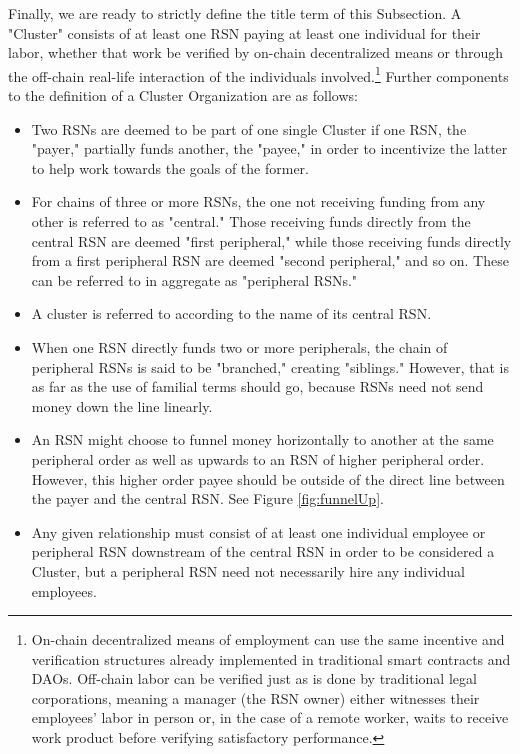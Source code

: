 \documentclass{article}[10pt]
\begin{document}
Finally, we are ready to strictly define the title term of this Subsection.
A "Cluster" consists of at least one RSN paying at least one individual for their labor, whether that work be verified by on-chain decentralized means or through the off-chain real-life interaction of the individuals involved.\footnote{
     On-chain decentralized means of employment can use the same incentive and verification structures already implemented in traditional smart contracts and DAOs.
     Off-chain labor can be verified just as is done by traditional legal corporations, meaning a manager (the RSN owner) either witnesses their employees' labor in person or, in the case of a remote worker, waits to receive work product before verifying satisfactory performance.}
Further components to the definition of a Cluster Organization are as follows:
\begin{itemize}
    \item Two RSNs are deemed to be part of one single Cluster if one RSN, the "payer," partially funds another, the "payee," in order to incentivize the latter to help work towards the goals of the former.
    
    \item For chains of three or more RSNs, the one not receiving funding from any other is referred to as "central."
    Those receiving funds directly from the central RSN are deemed "first peripheral," while those receiving funds directly from a first peripheral RSN are deemed "second peripheral," and so on.
    These can be referred to in aggregate as "peripheral RSNs."
    
    \item A cluster is referred to according to the name of its central RSN.
    
    \item When one RSN directly funds two or more peripherals, the chain of peripheral RSNs is said to be "branched," creating "siblings." 
    However, that is as far as the use of familial terms should go, because RSNs need not send money down the line linearly.
    
    \item An RSN might choose to funnel money horizontally to another at the same peripheral order as well as upwards to an RSN of higher peripheral order.
    However, this higher order payee should be outside of the direct line between the payer and the central RSN. See Figure \ref{fig:funnelUp}.
    
    \item Any given relationship must consist of at least one individual employee or peripheral RSN downstream of the central RSN in order to be considered a Cluster, but a peripheral RSN need not necessarily hire any individual employees.
    

\end{itemize}
\end{document}

